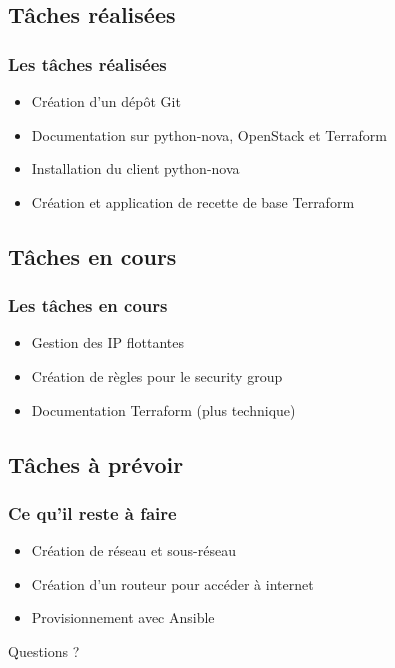 \documentclass[11pt]{beamer} %
\begin{document}
	
		
		\subsection{Tâches réalisées}
			\begin{frame}
				\frametitle{Les tâches réalisées}
				\begin{itemize}
					\item Création d'un dépôt Git
					\item Documentation sur python-nova, OpenStack et Terraform
					\item Installation du client python-nova
					\item Création et application de recette de base Terraform
				\end{itemize}
			\end{frame}
		
		
		\subsection{Tâches en cours}
			\begin{frame}
				\frametitle{Les tâches en cours}
				\begin{itemize}
					\item Gestion des IP flottantes
					\item Création de règles pour le security group
					\item Documentation Terraform (plus technique)
				\end{itemize}
			\end{frame}
		
			
		
		\subsection{Tâches à prévoir}
			\begin{frame}
				\frametitle{Ce qu'il reste à faire}
				\begin{itemize}
					\item Création de réseau et sous-réseau
					\item Création d'un routeur pour accéder à internet
					\item Provisionnement avec Ansible
				\end{itemize}
			\end{frame}
			
			
			\begin{frame}
			\begin{center}
			\Huge{Questions ?}
			\end{center}
			\end{frame}
\end{document}
